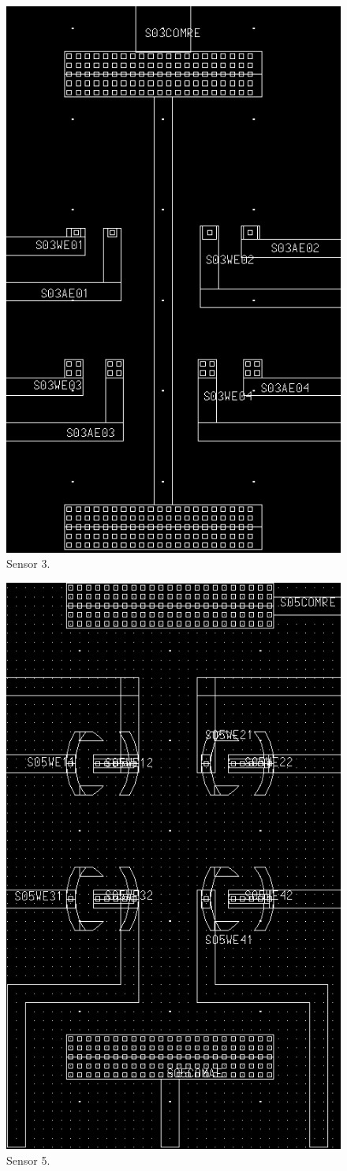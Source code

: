 \begin{figure}
	\centering
	\includegraphics[width=0.7\linewidth]{figures/s03.png}
	\caption{Sensor 3.}
	\label{s03}
\end{figure}

\begin{figure}
	\centering
	\includegraphics[width=0.7\linewidth]{figures/s05.png}
	\caption{Sensor 5.}
	\label{s05}
\end{figure}

